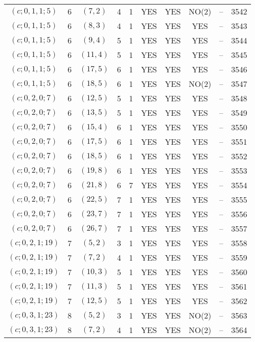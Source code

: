 \begin{longtable}{|c|c|c|c|c|c|c|c|c|c|}
$(c; 0, 1, 1; 5)$ & 6 & $(7, 2)$ & 4 & 1 & YES & YES & NO(2) & -- & 3542\\
$(c; 0, 1, 1; 5)$ & 6 & $(8, 3)$ & 4 & 1 & YES & YES & YES & -- & 3543\\
$(c; 0, 1, 1; 5)$ & 6 & $(9, 4)$ & 5 & 1 & YES & YES & YES & -- & 3544\\
$(c; 0, 1, 1; 5)$ & 6 & $(11, 4)$ & 5 & 1 & YES & YES & YES & -- & 3545\\
$(c; 0, 1, 1; 5)$ & 6 & $(17, 5)$ & 6 & 1 & YES & YES & YES & -- & 3546\\
$(c; 0, 1, 1; 5)$ & 6 & $(18, 5)$ & 6 & 1 & YES & YES & NO(2) & -- & 3547\\
$(c; 0, 2, 0; 7)$ & 6 & $(12, 5)$ & 5 & 1 & YES & YES & YES & -- & 3548\\
$(c; 0, 2, 0; 7)$ & 6 & $(13, 5)$ & 5 & 1 & YES & YES & YES & -- & 3549\\
$(c; 0, 2, 0; 7)$ & 6 & $(15, 4)$ & 6 & 1 & YES & YES & YES & -- & 3550\\
$(c; 0, 2, 0; 7)$ & 6 & $(17, 5)$ & 6 & 1 & YES & YES & YES & -- & 3551\\
$(c; 0, 2, 0; 7)$ & 6 & $(18, 5)$ & 6 & 1 & YES & YES & YES & -- & 3552\\
$(c; 0, 2, 0; 7)$ & 6 & $(19, 8)$ & 6 & 1 & YES & YES & YES & -- & 3553\\
$(c; 0, 2, 0; 7)$ & 6 & $(21, 8)$ & 6 & 7 & YES & YES & YES & -- & 3554\\
$(c; 0, 2, 0; 7)$ & 6 & $(22, 5)$ & 7 & 1 & YES & YES & YES & -- & 3555\\
$(c; 0, 2, 0; 7)$ & 6 & $(23, 7)$ & 7 & 1 & YES & YES & YES & -- & 3556\\
$(c; 0, 2, 0; 7)$ & 6 & $(26, 7)$ & 7 & 1 & YES & YES & YES & -- & 3557\\
$(c; 0, 2, 1; 19)$ & 7 & $(5, 2)$ & 3 & 1 & YES & YES & YES & -- & 3558\\
$(c; 0, 2, 1; 19)$ & 7 & $(7, 2)$ & 4 & 1 & YES & YES & YES & -- & 3559\\
$(c; 0, 2, 1; 19)$ & 7 & $(10, 3)$ & 5 & 1 & YES & YES & YES & -- & 3560\\
$(c; 0, 2, 1; 19)$ & 7 & $(11, 3)$ & 5 & 1 & YES & YES & YES & -- & 3561\\
$(c; 0, 2, 1; 19)$ & 7 & $(12, 5)$ & 5 & 1 & YES & YES & YES & -- & 3562\\
$(c; 0, 3, 1; 23)$ & 8 & $(5, 2)$ & 3 & 1 & YES & YES & NO(2) & -- & 3563\\
$(c; 0, 3, 1; 23)$ & 8 & $(7, 2)$ & 4 & 1 & YES & YES & NO(2) & -- & 3564\\

\end{longtable}
